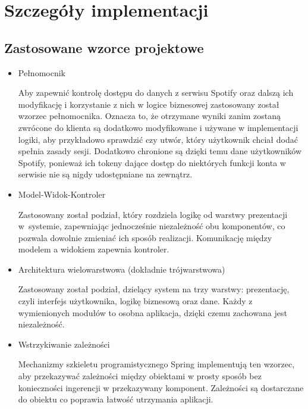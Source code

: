 \section{Szczegóły implementacji}
\subsection{Zastosowane wzorce projektowe}
\begin{itemize}
\item Pełnomocnik

Aby zapewnić kontrolę dostępu do danych z serwisu Spotify oraz dalszą ich modyfikację i korzystanie z nich w logice biznesowej zastosowany został wzorzec pełnomocnika. Oznacza to, że otrzymane wyniki zanim zostaną zwrócone do klienta są dodatkowo modyfikowane i używane w implementacji logiki, aby przykładowo sprawdzić czy utwór, który użytkownik chciał dodać spełnia zasady sesji. Dodatkowo chronione są dzięki temu dane użytkowników Spotify, ponieważ ich tokeny dające dostęp do niektórych funkcji konta w serwisie nie są nigdy udostępniane na zewnątrz.

\item Model-Widok-Kontroler

Zastosowany został podział, który rozdziela logikę od warstwy prezentacji w~systemie, zapewniając jednocześnie niezależność obu komponentów, co pozwala dowolnie zmieniać ich sposób realizacji. Komunikację między modelem a widokiem zapewnia kontroler.

\item Architektura wielowarstwowa (dokładnie trójwarstwowa)

Zastosowany został podział, dzielący system na trzy warstwy: prezentację, czyli interfejs użytkownika, logikę biznesową oraz dane. Każdy z wymienionych modułów to osobna aplikacja, dzięki czemu zachowana jest niezależność.

\item Wstrzykiwanie zależności

Mechanizmy szkieletu programistycznego Spring implementują ten wzorzec, aby przekazywać zależności między obiektami w prosty sposób bez konieczności ingerencji w przekazywany komponent. Zależności są dostarczane do obiektu co poprawia łatwość utrzymania aplikacji.
\end{itemize}







